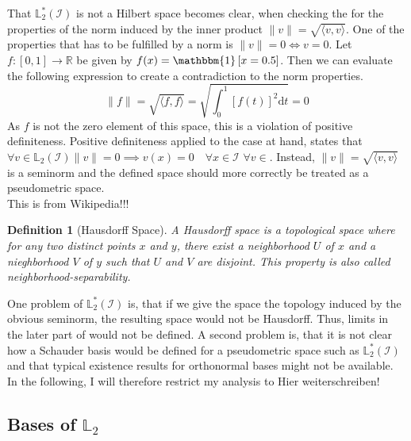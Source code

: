 \documentclass[12pt, a4paper]{article}
\theoremstyle{MAstyle} \newtheorem{assumption}{Assumption}[section]
\theoremstyle{MAstyle} \newtheorem{definition}{Definition}[section]
\theoremstyle{MAstyle} \newtheorem{theorem}{Theorem}[section]
\begin{document}
			That $\mathbb{L}^{*}_2(\mathcal{I})$ is not a Hilbert space becomes clear, when checking the for the properties of the norm induced by the inner product $\| v \| = \sqrt{\langle v, v\rangle}$.
			One of the properties that has to be fulfilled by a norm is $\| v \| = 0 \Longleftrightarrow v = 0$.			
			Let $f:[0,1] \rightarrow \mathbb{R}$ be given by $f(x) = \mathbbm{1}\left[x = 0.5\right]$. Then we can evaluate the following expression to create a contradiction to the norm properties.
			\begin{equation}
				\| f \| = \sqrt{\langle f, f\rangle} = \sqrt{\int_{0}^{1} \left[f(t)\right]^2\mathrm{d}t } = 0
			\end{equation}
			As $f$ is not the zero element of this space, this is a violation of positive definiteness. Positive definiteness applied to the case at hand, states that $\forall v \in \mathbb{L}_2\left(\mathcal{I}\right) \| v \| = 0 \implies v(x) = 0 \quad \forall x \in \mathcal{I}$  $\forall v \in $. Instead, $\| v \| = \sqrt{\langle v, v\rangle}$ is a seminorm and the defined space should more correctly be treated as a pseudometric space.\\
			
			{\color{red} This is from Wikipedia!!!}
			\begin{definition}[Hausdorff Space]
				A Hausdorff space is a topological space where for any two distinct points $x$ and $y$, there exist a neighborhood $U$ of $x$ and a nieghborhood $V$ of $y$ such that $U$ and $V$ are disjoint. This property is also called neighborhood-separability.
			\end{definition}
			
			One problem of $\mathbb{L}^{*}_2(\mathcal{I})$ is, that if we give the space the topology induced by the obvious seminorm, the resulting space would not be Hausdorff. Thus, limits in the later part of \cite{bugni_permutation_2021} would not be defined.
			A second problem is, that it is not clear how a Schauder basis would be defined for a pseudometric space such as $\mathbb{L}^{*}_2(\mathcal{I})$ and that typical existence results for orthonormal bases might not be available.\\			
			
			In the following, I will therefore restrict my analysis to {\color{red} Hier weiterschreiben!}

			
			
		\subsection{Bases of $\mathbb{L}_2$}\label{bases_L2}
			
\end{document}
